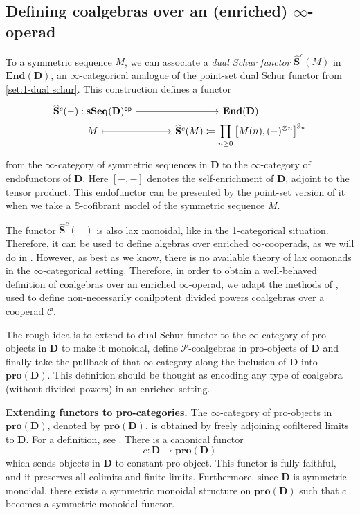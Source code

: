 \documentclass[a4paper,12pt]{amsart}
\theoremstyle{plain}
\theoremstyle{definition}
\theoremstyle{remark}
\begin{document}
\subsection{Defining coalgebras over an (enriched) $\infty$-operad}To a symmetric sequence $M$, we can associate a \emph{dual Schur functor} $\widehat{\mathbf{S}}^c(M)$ in $\mathbf{End}(\mathbf{D})$,  an $\infty$-categor\-ic\-al analogue of the point-set {dual Schur functor} from \cref{set:1-dual schur}. This construction  defines a functor 
\[
\begin{tikzcd}[column sep=3pc,row sep=0pc]
\widehat{\mathbf{S}}^c(-): \mathbf{sSeq}(\mathbf{D})^{\mathsf{op}} \arrow[r]
&\mathbf{End}(\mathbf{D}) \\
M \arrow[r,mapsto]
&\widehat{\mathbf{S}}^c(M) \coloneqq \displaystyle \prod_{n \geq 0} \left[M(n),(-)^{\otimes n}\right]^{\mathbb{S}_n} 
\end{tikzcd}
\]from the $\infty$-category of symmetric sequences in $\mathbf{D}$ to the $\infty$-category of endofunctors of $\mathbf{D}$. Here $[-,-]$ denotes the self-enrichment of $\mathbf{D}$, adjoint to the tensor product. This endofunctor can be presented by the point-set version of it when we take a $\mathbb{S}$-cofibrant model of the symmetric sequence $M$.


The functor $\widehat{\mathbf{S}}^c(-)$ is also lax monoidal, like in the 1-categorical situation. Therefore, it can be used to define algebras over enriched $\infty$-cooperads, as we will do in \cite{poinsetkoszul}. However, as best as we know, there is no available theory of lax comonads in the $\infty$-categorical setting. Therefore, in order to obtain a well-behaved definition of coalgebras over an enriched $\infty$-operad, we adapt the methods of \cite[Appendix A]{heuts2024}, used to define non-necessarily conilpotent divided powers coalgebras over a cooperad $\mathscr{C}$.


The rough idea is to extend to dual Schur functor to the $\infty$-category of pro-objects in $\mathbf{D}$ to make it monoidal, define $\mathscr{P}$-coalgebras in pro-objects of $\mathbf{D}$ and finally take the pullback of that $\infty$-category along the inclusion of $\mathbf{D}$ into $\mathbf{pro}(\mathbf{D})$.  This definition should be thought as encoding any type of coalgebra (without divided powers) in an enriched setting. 


\textbf{Extending functors to pro-categories.} The $\infty$-category of pro-objects in $\mathbf{pro}(\mathbf{D})$, denoted by $\mathbf{pro}(\mathbf{D})$, is obtained by freely adjoining cofiltered limits to $\mathbf{D}$. For a definition, see \cite[Section 3.1]{Lurie11Rational}. There is a canonical functor 
\[
c: \mathbf{D} \longrightarrow \mathbf{pro}(\mathbf{D})
\]
which sends objects in $\mathbf{D}$ to constant pro-object. This functor is fully faithful, and it preserves all colimits and finite limits. Furthermore, since $\mathbf{D}$ is symmetric monoidal, there exists a symmetric monoidal structure on $\mathbf{pro}(\mathbf{D})$ such that $c$ becomes a symmetric monoidal functor.
\end{document}
